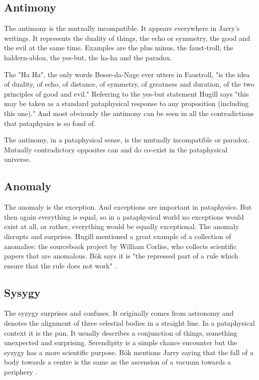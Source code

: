 \subsection{Antimony}

The antimony is the mutually incompatible. It appears everywhere in Jarry's writings. It represents the duality of things, the echo or symmetry, the good and the evil at the same time. Examples are the plus minus, the faust-troll, the haldern-ablou, the yes-but, the ha-ha and the paradox.

The "Ha Ha", the only words Bosse-da-Nage ever utters in Faustroll, "is the idea of duality, of echo, of distance, of symmetry, of greatness and duration, of the two principles of good and evil." \citep{Hugill2012} Referring to the yes-but statement Hugill says "this may be taken as a standard pataphysical response to any proposition (including this one)." And most obviously the antimony can be seen in all the contradictions that pataphysics is so fond of.

The antinomy, in a pataphysical sense, is the mutually incompatible or paradox. Mutually contradictory opposites can and do co-exist in the pataphysical universe.


\subsection{Anomaly}

The anomaly is the exception. And exceptions are important in pataphysics. But then again everything is equal, so in a pataphysical world no exceptions would exist at all, or rather, everything would be equally exceptional. The anomaly disrupts and surprises. Hugill mentioned a great example of a collection of anomalies: the sourcebook project by William Corliss, who collects scientific papers that are anomalous. Bök says it is "the repressed part of a rule which ensure that the rule does not work" \citep[p.38]{Bok2002}.


\subsection{Sysygy}

The syzygy surprises and confuses. It originally comes from astronomy and denotes the alignment of three celestial bodies in a straight line. In a pataphysical context it is the pun. It usually describes a conjunction of things, something unexpected and surprising. Serendipity is a simple chance encounter but the syzygy has a more scientific purpose. Bök mentions Jarry saying that the fall of a body towards a centre is the same as the ascension of a vacuum towards a periphery \citep[p.42]{Bok2002}.

